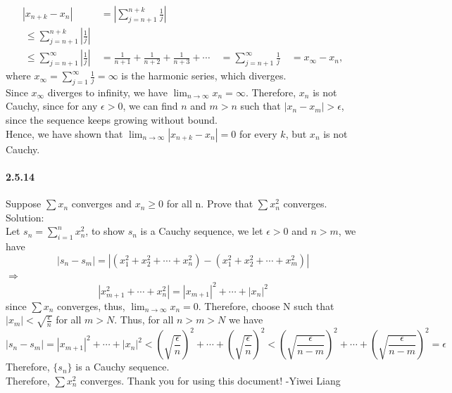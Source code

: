 \documentclass{article}
\begin{document}
\begin{align*}
|x_{n+k}-x_n| &= \left|\sum_{j=n+1}^{n+k}\frac{1}{j}\right| \
&\\\ \leq \sum_{j=n+1}^{n+k}\left|\frac{1}{j}\right| \
&\\\ \leq \sum_{j=n+1}^{\infty}\left|\frac{1}{j}\right| \
&= \frac{1}{n+1}+\frac{1}{n+2}+\frac{1}{n+3}+\cdots \
&= \sum_{j=n+1}^{\infty}\frac{1}{j} \
&= x_{\infty}-x_n,
\end{align*}
where $x_{\infty} = \sum_{j=1}^{\infty}\frac{1}{j} = \infty$ is the harmonic series, which diverges.\\
Since $x_{\infty}$ diverges to infinity, we have $\lim_{n\to \infty} x_n = \infty$. Therefore, ${x_n}$ is not Cauchy, since for any $\epsilon>0$, we can find $n$ and $m>n$ such that $|x_n - x_m| > \epsilon$, since the sequence keeps growing without bound.\\
Hence, we have shown that $\lim_{n\to \infty}|x_{n+k}-x_n|=0$ for every $k$, but ${x_n}$ is not Cauchy.
\paragraph{2.5.14}
Suppose $\sum x_n$ converges and $x_n\ge 0$ for all n. Prove that $\sum x_n^2$ converges.\\
Solution:\\
Let $s_n=\sum_{i=1}^{n}x_n^2$, to show $s_n$ is a Cauchy sequence, we let $\epsilon>0$ and $n>m$, we have
$$|s_n-s_m|=|(x_1^2+x_2^2+\cdots+x_n^2)-(x_1^2+x_2^2+\cdots+x_m^2)|$$
$\Longrightarrow$
$$|x_{m+1}^2+\cdots+x_{n}^2|=|x_{m+1}|^2+\cdots+|x_n|^2$$
since $\sum x_n$ converges, thus, $\lim_{n\to \infty}x_n=0$. Therefore, choose N such that $|x_m|<\sqrt{\frac{\epsilon}{n}}$ for all $m>N.$ Thus, for all $n>m>N$ we have $$|s_n-s_m|=|x_{m+1}|^2+\cdots+|x_n|^2<(\sqrt{\frac{\epsilon}{n}})^2+\cdots+(\sqrt{\frac{\epsilon}{n}})^2<(\sqrt{\frac{\epsilon}{n-m}})^2+\cdots+(\sqrt{\frac{\epsilon}{n-m}})^2=\epsilon$$
Therefore, $\{s_n\}$ is a Cauchy sequence.\\
Therefore, $\sum x_n^2$ converges.
\newpage
Thank you for using this document! -Yiwei Liang
\end{document}
